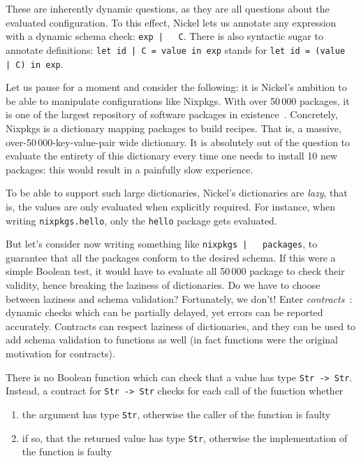 \documentclass[sigplan,10pt,review,anonymous]{acmart}
\newcommand{\unsure}[2][1=]{}
\newcommand{\nickel}[1]{\lstinline[language=nickel]{#1}}
\begin{document}
These are inherently dynamic questions, as they are all questions
about the evaluated configuration. To this effect, Nickel lets us
annotate any expression with a dynamic schema check: \nickel{exp |
  C}. There is also syntactic sugar to annotate definitions:
\nickel{let id | C = value in exp} stands for \nickel{let id = (value
  | C) in exp}.\unsure{This point used to be made, do we want to
  reinsert it? However, Nickel programs are of a special kind: they are usually
simple, terminating programs that run on fixed inputs. Correctness errors will
show up at evaluation anyway, or will not matter (dead code).}

Let us pause for a moment and consider the following: it is Nickel's
ambition to be able to manipulate configurations like Nixpkgs. With
over 50\,000 packages, it is one of the largest repository of software
packages in existence~\cite{repology}. Concretely, Nixpkgs is a
dictionary mapping packages to build recipes. That is, a massive,
over-50\,000-key-value-pair wide dictionary. It is absolutely out of the
question to evaluate the entirety of this dictionary every time one
needs to install 10 new packages: this would result in a painfully
slow experience.

To be able to support such large dictionaries, Nickel's dictionaries
are \emph{lazy}, that is, the values are only evaluated when
explicitly required. For instance, when writing
\hbox{\nickel{nixpkgs.hello},} only the \nickel{hello} package gets
evaluated.

But let's consider now writing something like \nickel{nixpkgs |
  packages}, to guarantee that all the packages conform to the desired
schema. If this were a simple Boolean test, it would have to evaluate
all 50\,000 package to check their validity, hence breaking the
laziness of dictionaries. Do we have to choose between laziness and
schema validation? Fortunately, we don't! Enter
\emph{contracts}~\cite{FindlerFelleisenHOContracts}: dynamic checks
which can be partially delayed, yet errors can be reported
accurately. Contracts can respect laziness of dictionaries, and they
can be used to add schema validation to functions as well (in fact
functions were the original motivation for contracts).

There is no Boolean function which can check that a value has type
\nickel{Str -> Str}. Instead, a contract for \nickel{Str -> Str}
checks for each call of the function whether
\begin{enumerate}
\item the argument has type \nickel{Str}, otherwise the caller of the
  function is faulty
\item if so, that the returned value has type \nickel{Str}, otherwise
  the implementation of the function is faulty
\end{enumerate}
\end{document}
